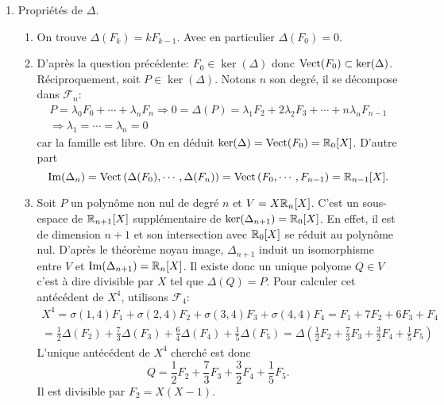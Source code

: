 \begin{enumerate}
 \item Propriétés de $\Delta$.
 \begin{enumerate}
  \item On trouve $\Delta(F_k) = k F_{k-1}$. Avec en particulier $\Delta(F_0) = 0$.
  \item D'après la question précédente: $F_0 \in \ker(\Delta)$ donc $\operatorname{Vect}(F_0) \subset \ker(\Delta)$. Réciproquement, soit $P\in \ker(\Delta)$. Notons $n$ son degré, il se décompose dans $\mathcal{F}_n$:
\begin{multline*}
 P = \lambda_0 F_0 + \cdots + \lambda_n F_n 
 \Rightarrow 0 = \Delta(P) = \lambda_1 F_2 + 2\lambda_2 F_3 + \cdots + n\lambda_n F_{n-1}\\
 \Rightarrow \lambda_1 = \cdots = \lambda_n = 0
\end{multline*}
car la famille est libre. On en déduit $\ker(\Delta) = \operatorname{Vect}(F_0) = \mathbb{R}_0[X]$.\newline  
D'autre part 
\[
\operatorname{Im}(\Delta_n) =\operatorname{Vect}\left( \Delta(F_0), \cdots, \Delta(F_{n})\right) = \operatorname{Vect}\left( F_0, \cdots, F_{n-1}\right) = \mathbb{R}_{n-1}[X]. 
\]

  \item Soit $P$ un polynôme non nul de degré $n$ et $V=X\mathbb{R}_{n}[X]$.\newline
  C'est un sous-espace de $\mathbb{R}_{n+1}[X]$ supplémentaire de $\ker(\Delta_{n+1}) = \mathbb{R}_0[X]$. En effet, il est de dimension $n+1$ et son intersection avec $\mathbb{R}_0[X]$ se réduit au polynôme nul. D'après le théorème noyau image, $\Delta_{n+1}$ induit un isomorphisme entre $V$ et $\operatorname{Im}(\Delta_{n+1})=\mathbb{R}_n[X]$. Il existe donc un unique polyome $Q\in V$ c'est à dire divisible par $X$ tel que $\Delta(Q) = P$.\newline
  Pour calculer cet antécédent de $X^4$, utilisons $\mathcal{F}_4$:
\begin{multline*}
 X^4 = \sigma(1,4)F_1 + \sigma(2,4)F_2 + \sigma(3,4)F_3 + \sigma(4,4)F_4
 = F_1 + 7F_2 + 6F_3 + F_4 \\
 = \frac{1}{2}\Delta(F_2) + \frac{7}{3}\Delta(F_3) + \frac{6}{4}\Delta(F_4) + \frac{1}{5}\Delta(F_5)
 = \Delta\left( \frac{1}{2}F_2 + \frac{7}{3}F_3 + \frac{3}{2}F_4 + \frac{1}{5}F_5\right) 
\end{multline*}
L'unique antécédent de $X^4$ cherché est donc
\[
 Q = \frac{1}{2}F_2 + \frac{7}{3}F_3 + \frac{3}{2}F_4 + \frac{1}{5}F_5.
\]
Il est divisible par $F_2 = X(X-1)$.
 \end{enumerate}


\end{enumerate}

